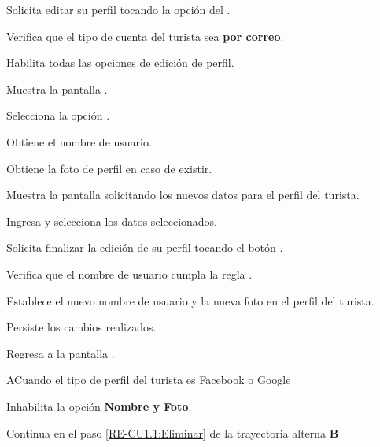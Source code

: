	\begin{UCtrayectoria}
		\UCpaso [\UCactor] Solicita editar su perfil tocando la opción  del .
		
		\UCpaso Verifica que el tipo de cuenta del turista sea \textbf{por correo}. 
		
		\UCpaso Habilita todas las opciones de edición de perfil.
		
		\UCpaso Muestra la pantalla .
		
		\UCpaso [\UCactor] Selecciona la opción . 
		
		\UCpaso Obtiene el nombre de usuario.
		
		\UCpaso Obtiene la foto de perfil en caso de existir.
		
		\UCpaso Muestra la pantalla  solicitando los nuevos datos para el perfil del turista.
		
		\UCpaso [\UCactor] \label{RE-CU1.1:IngresaDatos} Ingresa y selecciona los datos seleccionados.
		
		\UCpaso [\UCactor] Solicita finalizar la edición de su perfil tocando el botón . 
		
		\UCpaso Verifica que el nombre de usuario cumpla la regla . 
		
		\UCpaso Establece el nuevo nombre de usuario y la nueva foto en el perfil del turista.
		
		\UCpaso Persiste los cambios realizados. 
		
		\UCpaso \label{RE-CU1.1:Pantalla} Regresa a la pantalla . 
	\end{UCtrayectoria}

	\begin{UCtrayectoriaA}{A}{Cuando el tipo de perfil del turista es Facebook o Google}
			
		\UCpaso Inhabilita la opción \textbf{Nombre y Foto}.
		
		\UCpaso Continua en el paso \ref{RE-CU1.1:Eliminar} de la trayectoria alterna \textbf{B}
			
	\end{UCtrayectoriaA}
		
